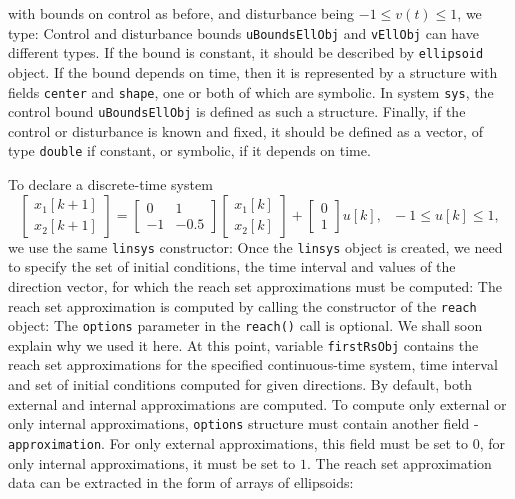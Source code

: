 with bounds on control as before, and disturbance being $-1\leq v(t)\leq1$,
we type:
Control and disturbance bounds {\tt uBoundsEllObj} and {\tt vEllObj} can have different types.
If the bound is constant, it should be described by {\tt ellipsoid} object.
If the bound depends on time, then it is represented by a structure with
fields {\tt center} and {\tt shape}, one or both of which are symbolic.
In system {\tt sys}, the control bound {\tt uBoundsEllObj} is defined as such a structure.
Finally, if the control or disturbance is known and fixed, it should be
defined as a vector, of type {\tt double} if constant, or symbolic, if
it depends on time.

To declare a discrete-time system
\[ \left[\begin{array}{c}
x_1[k+1]\\
x_2[k+1]\end{array}\right] = \left[\begin{array}{cc}
0 & 1\\
-1 & -0.5\end{array}\right]\left[\begin{array}{c}
x_1[k]\\
x_2[k]\end{array}\right] + \left[\begin{array}{c}
0\\
1\end{array}\right]u[k], ~~~ -1\leq u[k]\leq 1,\]
we use the same {\tt linsys} constructor:
Once the {\tt linsys} object is created, we need to specify the set
of initial conditions, the time interval and values of the direction vector,
for which the reach set approximations must be computed:
The reach set approximation is computed by calling the constructor
of the {\tt reach} object:
The {\tt options} parameter in the {\tt reach()} call is optional.
We shall soon explain why we used it here.
At this point, variable {\tt firstRsObj} contains the reach set approximations for the
specified continuous-time system, time interval and set of initial conditions
computed for given directions. By default, both external and internal
approximations are computed. To compute only external or only internal
approximations, {\tt options} structure must contain
another field - {\tt approximation}.
For only external approximations, this field
must be set to $0$, for only internal approximations, it must be set to $1$.
The reach set approximation data can be
extracted in the form of arrays of ellipsoids:

